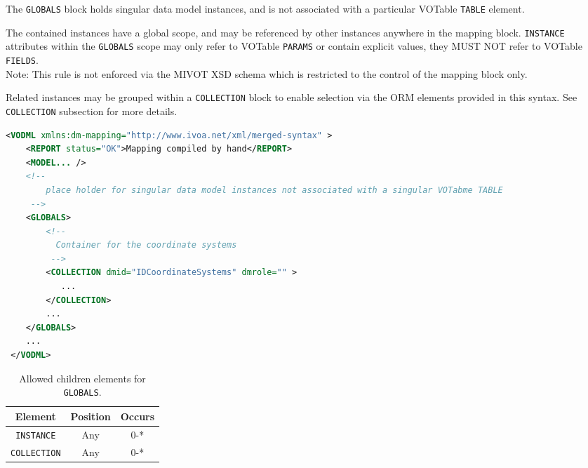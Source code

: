 The \texttt{GLOBALS} block holds singular data model instances, and is not associated 
with a particular VOTable \texttt{TABLE} element.

The contained instances have a global scope, and may be
referenced by other instances anywhere in the mapping block.  \texttt{INSTANCE} attributes
within the \texttt{GLOBALS} scope may only refer to VOTable \texttt{PARAMS} or contain
explicit values, they MUST NOT refer to VOTable \texttt{FIELDS}.  \\ 
Note: This rule is not enforced via the MIVOT XSD schema which is restricted to the control of the mapping block only.

Related instances may be grouped within a \texttt{COLLECTION} block to enable selection
via the ORM elements provided in this syntax.  See \texttt{COLLECTION} subsection for more details.

\begin{lstlisting}[caption={Example \texttt{GLOBALS} block (see in \ref{GLOBALS_snippet}) which contains a collection of coordinate systems.},language=XML]
<VODML xmlns:dm-mapping="http://www.ivoa.net/xml/merged-syntax" >
    <REPORT status="OK">Mapping compiled by hand</REPORT>
    <MODEL... />
    <!--	             
        place holder for singular data model instances not associated with a singular VOTabme TABLE
     -->
    <GLOBALS>
        <!--
          Container for the coordinate systems
         -->
        <COLLECTION dmid="IDCoordinateSystems" dmrole="" >
           ...
        </COLLECTION>
        ...
    </GLOBALS>
    ...
 </VODML>
\end{lstlisting}


\begin{table}[!htbp]
  \small
  \centering
  \begin{tabulary}{\linewidth}{|c |c |c|}
    \hline 
        \textbf{Element} &
        \textbf{Position} &
        \textbf{Occurs}\\
    \hline
    \hline
        \texttt{INSTANCE} &
        Any &
        0-*\\
    \hline
        \texttt{COLLECTION} &
        Any &
        0-*\\
    \hline
  \end{tabulary}
  \caption{Allowed children elements for \texttt{GLOBALS}.} 
  \label{tbl:globals-children}
 \end{table}
